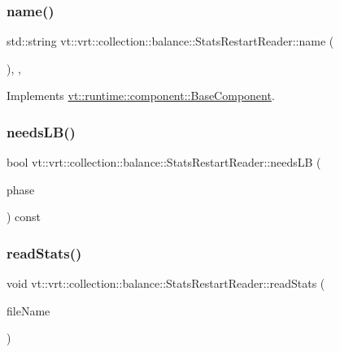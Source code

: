 \subsubsection{\texorpdfstring{name()}{name()}}
{\footnotesize\ttfamily std\+::string vt\+::vrt\+::collection\+::balance\+::\+Stats\+Restart\+Reader\+::name (\begin{DoxyParamCaption}{ }\end{DoxyParamCaption})\hspace{0.3cm}{\ttfamily [inline]}, {\ttfamily [override]}, {\ttfamily [virtual]}}



Implements \hyperlink{structvt_1_1runtime_1_1component_1_1_base_component_a7701485f3539f78d42e6bad47fc7eb78}{vt\+::runtime\+::component\+::\+Base\+Component}.

\mbox{\label{structvt_1_1vrt_1_1collection_1_1balance_1_1_stats_restart_reader_a419dd1d7c0b6d3a9fb9a1666990e5325}} 
\subsubsection{\texorpdfstring{needs\+L\+B()}{needsLB()}}
{\footnotesize\ttfamily bool vt\+::vrt\+::collection\+::balance\+::\+Stats\+Restart\+Reader\+::needs\+LB (\begin{DoxyParamCaption}\item[{\hyperlink{namespacevt_a46ce6733d5cdbd735d561b7b4029f6d7}{Phase\+Type}}]{phase }\end{DoxyParamCaption}) const}

\mbox{\label{structvt_1_1vrt_1_1collection_1_1balance_1_1_stats_restart_reader_a8eeb8ec940e2bd7e7e41bccf2462a4d6}} 
\subsubsection{\texorpdfstring{read\+Stats()}{readStats()}}
{\footnotesize\ttfamily void vt\+::vrt\+::collection\+::balance\+::\+Stats\+Restart\+Reader\+::read\+Stats (\begin{DoxyParamCaption}\item[{std\+::string const \&}]{file\+Name }\end{DoxyParamCaption})}

